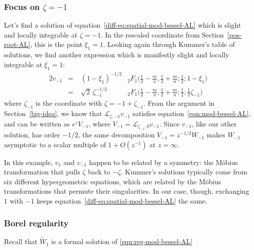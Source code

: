 \documentclass{article}
\newcommand{\laplace}{\mathcal{L}}
\begin{document}
\subsubsection{Focus on $\zeta = -1$}\label{neg-root-AL}
Let's find a solution of equation~\eqref{diff-eq:spatial-mod-bessel-AL} which is slight and locally integrable at $\zeta = -1$. In the rescaled coordinate from Section~\ref{pos-root-AL}, this is the point $\xi_1 = 1$. Looking again through Kummer's table of solutions, we find another expression \cite[formula~15.10.14]{dlmf} which is manifestly slight and locally integrable at $\xi_1 = 1$:
\begin{alignat*}{2}
v_{-1} &=\;& (1-\xi_1)^{-1/2} & {}_2F_1\big(\tfrac{1}{2}-\tfrac{m}{n}, \tfrac{1}{2}+\tfrac{m}{n}; \tfrac{1}{2}; 1-\xi_1\big) \\
&=\;& \sqrt{2}\,\zeta_{-1}^{-1/2} & {}_2F_1\big(\tfrac{1}{2}-\tfrac{m}{n}, \tfrac{1}{2}+\tfrac{m}{n}; \tfrac{1}{2}; \tfrac{1}{2}\zeta_{-1}\big)
\end{alignat*}
where $\zeta_{-1}$ is the coordinate with $\zeta = -1 + \zeta_{-1}$. From the argument in Section~\ref{big-idea}, we know that $\laplace_{\zeta, -1} v_{-1}$ satisfies equation~\eqref{eqn:mod-bessel-AL}, and can be written as $e^z V_{-1}$, where $V_{-1} = \laplace_{\zeta_{-1}, 0} v_{-1}$. Since $v_{-1}$, like our other solution, has order $-1/2$, the same decomposition $V_{-1} = z^{-1/2} W_{-1}$ makes $W_{-1}$ asymptotic to a scalar multiple of $1+O(z^{-1})$ at $z = \infty$.

In this example, $v_1$ and $v_{-1}$ happen to be related by a symmetry: the M\"{o}bius transformation that pulls $\zeta$ back to $-\zeta$. Kummer's solutions typically come from six different hypergeometric equations, which are related by the M\"{o}bius transformations that permute their singularities. In our case, though, exchanging $1$ with $-1$ keeps equation~\eqref{diff-eq:spatial-mod-bessel-AL} the same.

\color{DarkTurquoise}
\subsubsection{Borel regularity}\label{bessel-regularity-AL}
Recall that $\tilde{W}_1$ is a formal solution of \eqref{eqn:reg-mod-bessel-AL}
\end{document}
